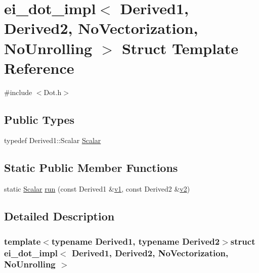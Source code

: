 \hypertarget{structei__dot__impl_3_01_derived1_00_01_derived2_00_01_no_vectorization_00_01_no_unrolling_01_4}{\section{ei\-\_\-dot\-\_\-impl$<$ Derived1, Derived2, No\-Vectorization, No\-Unrolling $>$ Struct Template Reference}
\label{structei__dot__impl_3_01_derived1_00_01_derived2_00_01_no_vectorization_00_01_no_unrolling_01_4}
}


{\ttfamily \#include $<$Dot.\-h$>$}

\subsection*{Public Types}
\begin{DoxyCompactItemize}
\item 
typedef Derived1\-::\-Scalar \hyperlink{structei__dot__impl_3_01_derived1_00_01_derived2_00_01_no_vectorization_00_01_no_unrolling_01_4_a91946ca41ce62778321cce0318648e3e}{Scalar}
\end{DoxyCompactItemize}
\subsection*{Static Public Member Functions}
\begin{DoxyCompactItemize}
\item 
static \hyperlink{structei__dot__impl_3_01_derived1_00_01_derived2_00_01_no_vectorization_00_01_no_unrolling_01_4_a91946ca41ce62778321cce0318648e3e}{Scalar} \hyperlink{structei__dot__impl_3_01_derived1_00_01_derived2_00_01_no_vectorization_00_01_no_unrolling_01_4_ac9f63ba63db3b9d32abbaaadd7e9f1fa}{run} (const Derived1 \&\hyperlink{glext_8h_aabdd9aabede45fcf97cea04f88d2ad60}{v1}, const Derived2 \&\hyperlink{glext_8h_ae35401c8c2fcdcc48c20ba325ee473ea}{v2})
\end{DoxyCompactItemize}


\subsection{Detailed Description}
\subsubsection*{template$<$typename Derived1, typename Derived2$>$struct ei\-\_\-dot\-\_\-impl$<$ Derived1, Derived2, No\-Vectorization, No\-Unrolling $>$}



